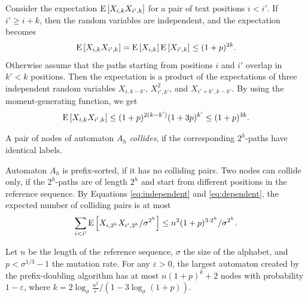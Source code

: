 Consider the expectation $\mathrm{E}\left[ X_{i,k} X_{i',k} \right]$ for a pair of text positions $i < i'$. If $i' \ge i + k$, then the random variables are independent, and the expectation becomes
\begin{equation}\label{eq:independent}
\mathrm{E}\left[ X_{i,k} X_{i',k} \right] = \mathrm{E}\left[ X_{i,k} \right] \mathrm{E}\left[ X_{i',k} \right] \le (1+p)^{2k}.
\end{equation}
Otherwise assume that the paths starting from positions $i$ and $i'$ overlap in $k' < k$ positions. Then the expectation is a product of the expectations of three independent random variables $X_{i,k-k'}$, $X_{i',k'}^{2}$, and $X_{i'+k',k-k'}$. By using the moment-generating function, we get
\begin{equation}\label{eq:dependent}
\mathrm{E}\left[ X_{i,k} X_{i',k} \right]  \le (1+p)^{2(k-k')} (1+3p)^{k'} \le (1+p)^{3k}.
\end{equation}

\begin{definition}
A pair of nodes of automaton $A_{h}$ {\em collides}, if the corresponding $2^{h}$-paths have identical labels.
\end{definition}

Automaton $A_{h}$ is prefix-sorted, if it has no colliding pairs. Two nodes can collide only, if the $2^{h}$-paths are of length $2^{h}$ and start from different positions in the reference sequence. By Equations \ref{eq:independent} and \ref{eq:dependent}, the expected number of colliding pairs is at most
\begin{equation}\label{eq:node bound}
\sum_{i < i'} \mathrm{E}\left[ X_{i,2^{h}} X_{i',2^{h}} / \sigma^{2^{h}} \right] \le  n^{2} (1+p)^{3 \cdot 2^{h}} / \sigma^{2^{h}}.
\end{equation}

\begin{lemma}\label{lemma:expected number of nodes}
Let $n$ be the length of the reference sequence, $\sigma$ the size of the alphabet, and $p < \sigma^{1/3} - 1$ the mutation rate. For any $\varepsilon > 0$, the largest automaton created by the prefix-doubling algorithm has at most $n(1+p)^{k} + 2$ nodes with probability $1-\varepsilon$, where $k = 2 \log_{\sigma} \frac{n^{2}}{\varepsilon} / (1 - 3 \log_{\sigma} (1+p))$.
\end{lemma}

